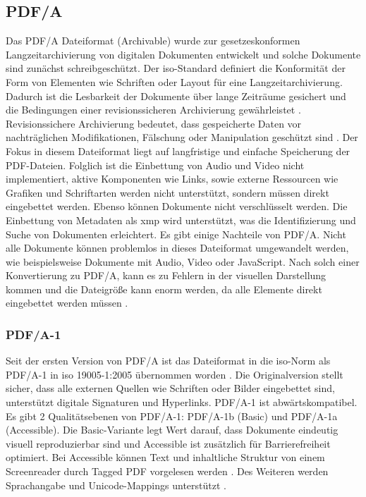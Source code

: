 \subsection{PDF/A}
Das PDF/A Dateiformat (Archivable) wurde zur gesetzeskonformen Langzeitarchivierung von digitalen Dokumenten entwickelt und solche Dokumente sind zunächst schreibgeschützt. Der \gls{iso}-Standard definiert die Konformität der Form von Elementen wie Schriften oder Layout für eine Langzeitarchivierung. Dadurch ist die Lesbarkeit der Dokumente über lange Zeiträume gesichert und die Bedingungen einer revisionssicheren Archivierung gewährleistet \cite{adobe-pdf-a}. Revisionssichere Archivierung bedeutet, dass gespeicherte Daten vor nachträglichen Modifikationen, Fälschung oder Manipulation geschützt sind \cite{adobe-revisions}.  Der Fokus in diesem Dateiformat liegt auf langfristige und einfache Speicherung der PDF-Dateien. Folglich ist die Einbettung von Audio und Video nicht implementiert, aktive Komponenten wie Links, sowie externe Ressourcen wie Grafiken und Schriftarten werden nicht unterstützt, sondern müssen direkt eingebettet werden. Ebenso können Dokumente nicht verschlüsselt werden. Die Einbettung von Metadaten als \gls{xmp} wird unterstützt, was die Identifizierung und Suche von Dokumenten erleichtert. Es gibt einige Nachteile von PDF/A. Nicht alle Dokumente können problemlos in dieses Dateiformat umgewandelt werden, wie beispielsweise Dokumente mit Audio, Video oder JavaScript. Nach solch einer Konvertierung zu PDF/A, kann es zu Fehlern in der visuellen Darstellung kommen und die Dateigröße kann enorm werden, da alle Elemente direkt eingebettet werden müssen \cite{adobe-pdf-a}.

\subsubsection{PDF/A-1}
Seit der ersten Version von PDF/A ist das Dateiformat in die \gls{iso}-Norm als PDF/A-1 in \gls{iso} 19005-1:2005 übernommen worden \cite{proj-consult}. Die Originalversion stellt sicher, dass alle externen Quellen wie Schriften oder Bilder eingebettet sind, unterstützt digitale Signaturen und Hyperlinks. PDF/A-1 ist abwärtskompatibel. Es gibt 2 Qualitätsebenen von PDF/A-1: PDF/A-1b (Basic) und PDF/A-1a (Accessible). Die Basic-Variante legt Wert darauf, dass Dokumente eindeutig visuell reproduzierbar sind und Accessible ist zusätzlich für Barrierefreiheit optimiert. Bei Accessible können Text und inhaltliche Struktur von einem Screenreader durch Tagged PDF vorgelesen werden \cite{adobe-pdf-a}. Des Weiteren werden Sprachangabe und Unicode-Mappings unterstützt \cite{proj-consult}.


